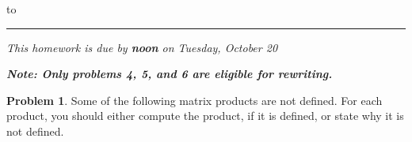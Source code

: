 \documentclass[11pt]{article}
\theoremstyle{definition}
\newtheorem{problem}{Problem}
\begin{document}
\hbox to 
\nointerlineskip
\vskip 2pt
\hrule height 1pt

\medskip

\centerline{\textit{This homework is due by \textbf{noon} on Tuesday, October 20}}
\centerline{\textit{\textbf{Note: Only problems 4, 5, and 6 are eligible for rewriting.}}}

\medskip


\begin{problem}
Some of the following matrix products are not defined.  For each product, you should 
either compute the product, if it is defined, or state why it is not defined.

\bigskip
{}
   
\bigskip
{}

\end{problem}
\end{document}
